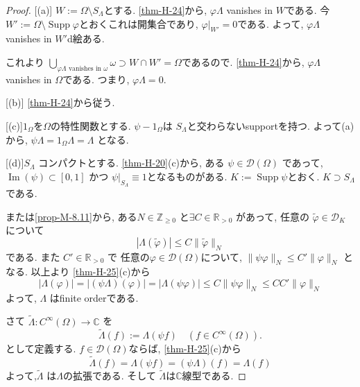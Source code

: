 \documentclass[dvipdfmx,a4paper,11pt]{article} %
\theoremstyle{definition}
\theoremstyle{remark}
\numberwithin{equation}{section}
\begin{document}
\begin{proof}

[(a)]
 \(W := \Omega \setminus S_\Lambda\)とする. 
 \ref{thm-H-24}から,  \(\varphi \Lambda\) vanishes in \(W\)である. 
 今\(W' := \Omega \setminus \operatorname{Supp}\varphi\)とおくこれは開集合であり,  \(\varphi|_{W'} = 0\)である. 
 よって,  \(\varphi \Lambda\) vanishes in \(W'\)d絵ある. 

これより \(\bigcup_{\varphi \Lambda \text{ vanishes in } \omega} \omega \supset W \cap W' = \Omega\)であるので. 
 \ref{thm-H-24}から,   \(\varphi \Lambda\) vanishes in \(\Omega\)である. つまり, \(\varphi \Lambda = 0\).

[(b)]  \ref{thm-H-24}から従う.

[(c)]$1_{\Omega}$を$\Omega$の特性関数とする. 
 \(\psi - 1_\Omega\)は \(S_\Lambda\)と交わらないsupportを持つ. 
 よって(a)から, \(\psi \Lambda = 1_\Omega \Lambda = \Lambda\) となる.
  
[(d)]\(S_\Lambda\) コンパクトとする. 
\ref{thm-H-20}(c)から, 
ある \( \psi \in \mathcal{D}(\Omega)\) であって, 
 \(\operatorname{Im}(\psi) \subset [0,1]\) かつ \(\psi|_{S_\Lambda} \equiv 1\)となるものがある. 
\(K := \operatorname{Supp}\psi\)とおく. $K\supset S_\Lambda$である.  

\cite[Thm 6.8]{Rud}または\ref{prop-M-8.11}から,
ある\(N \in \mathbb{Z}_{\ge 0}\) と\(\exists C \in \mathbb{R}_{>0}\) があって, 任意の
$\tilde{\varphi} \in \mathcal{D}_K$について
\[
|\Lambda(\tilde{\varphi})| \le C \|\tilde{\varphi}\|_N
 \]
である. 
また \(C' \in \mathbb{R}_{>0}\) で 任意の\(\varphi \in \mathcal{D}(\Omega)\)について, 
\(\|\psi \varphi\|_N \le C' \|\varphi\|_N \) となる. 
以上より \ref{thm-H-25}(c)から
\[
|\Lambda(\varphi)| 
= 
|(\psi \Lambda)(\varphi)| 
= |\Lambda(\psi \varphi)| 
\le C \|\psi \varphi\|_N 
\le CC' \|\varphi\|_N
\]  
よって,  \(\Lambda\) はfinite orderである. 

さて \(\tilde{\Lambda}: C^\infty(\Omega) \to \mathbb{C}\) を
\[
\tilde{\Lambda}(f) := \Lambda(\psi f) \quad (f \in C^\infty(\Omega)).
\]
として定義する. 
 \(f \in \mathcal{D}(\Omega)\)ならば, \ref{thm-H-25}(c)から
\[
\tilde{\Lambda}(f) = \Lambda(\psi f) = (\psi \Lambda)(f) = \Lambda(f) 
\]  
よって,\(\tilde{\Lambda}\) は\(\Lambda\)の拡張である.
そして \(\tilde{\Lambda}\)は$\mathbb{C}$線型である.  


\end{proof}
\end{document}
